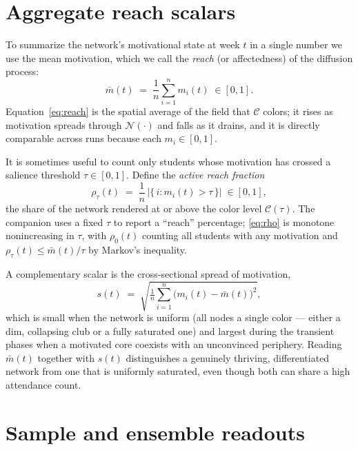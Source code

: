 \documentclass[11pt]{article}
\newcommand{\Nn}{\mathcal{N}}
\begin{document}
\section{Aggregate reach scalars}

To summarize the network's motivational state at week $t$ in a single number we use the mean
motivation, which we call the \emph{reach} (or affectedness) of the diffusion process:
\begin{equation}
  \bar{m}(t) \;=\; \frac{1}{n}\sum_{i=1}^{n} m_i(t) \;\in[0,1].
  \label{eq:reach}
\end{equation}
Equation~\eqref{eq:reach} is the spatial average of the field that $\mathcal{C}$ colors; it rises as
motivation spreads through $\Nn(\cdot)$ and falls as it drains, and it is directly comparable across
runs because each $m_i\in[0,1]$.

It is sometimes useful to count only students whose motivation has crossed a salience threshold
$\tau\in[0,1]$. Define the \emph{active reach fraction}
\begin{equation}
  \rho_\tau(t) \;=\; \frac{1}{n}\,\bigl|\{\, i : m_i(t) > \tau \,\}\bigr| \;\in[0,1],
  \label{eq:rho}
\end{equation}
the share of the network rendered at or above the color level $\mathcal{C}(\tau)$. The companion uses
a fixed $\tau$ to report a ``reach'' percentage; \eqref{eq:rho} is monotone nonincreasing in $\tau$,
with $\rho_0(t)$ counting all students with any motivation and $\rho_\tau(t)\le \bar m(t)/\tau$ by
Markov's inequality.

A complementary scalar is the cross-sectional spread of motivation,
\begin{equation}
  s(t) \;=\; \sqrt{\tfrac{1}{n}\textstyle\sum_{i=1}^{n}\bigl(m_i(t)-\bar m(t)\bigr)^2},
  \label{eq:spread}
\end{equation}
which is small when the network is uniform (all nodes a single color --- either a dim, collapsing
club or a fully saturated one) and largest during the transient phases when a motivated core
coexists with an unconvinced periphery. Reading $\bar m(t)$ together with $s(t)$ distinguishes a
genuinely thriving, differentiated network from one that is uniformly saturated, even though both can
share a high attendance count.


\section{Sample and ensemble readouts}
\end{document}
